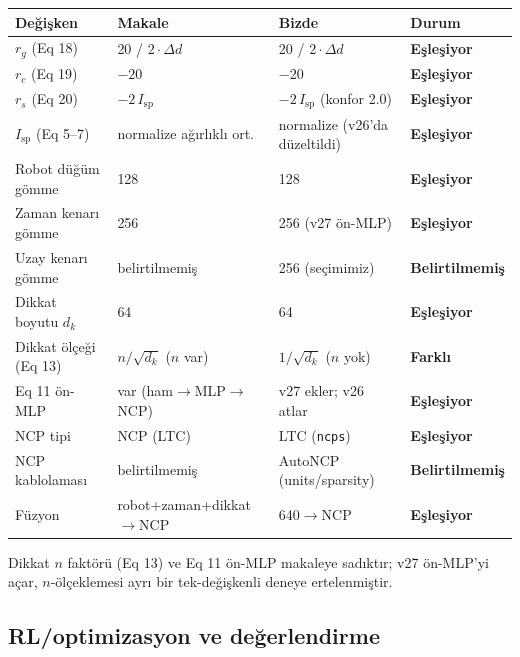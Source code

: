 \documentclass[11pt,a4paper]{article}
\newcommand{\msp}{I_{\mathrm{sp}}}
\newcommand{\dmatch}{\textcolor{cgreen}{\textbf{Eşleşiyor}}}
\newcommand{\ddiff}{\textcolor{cred}{\textbf{Farklı}}}
\newcommand{\dunspec}{\textcolor{camber}{\textbf{Belirtilmemiş}}}
\begin{document}
\begin{table}[H]
\centering\small
\begin{tabular}{@{}p{3.2cm}p{4.0cm}p{4.4cm}l@{}}
\toprule
\textbf{Değişken} & \textbf{Makale} & \textbf{Bizde} & \textbf{Durum} \\
\midrule
$r_g$ (Eq 18) & 20 / $2\cdot\Delta d$ & 20 / $2\cdot\Delta d$ & \dmatch \\
$r_c$ (Eq 19) & $-20$ & $-20$ & \dmatch \\
$r_s$ (Eq 20) & $-2\,\msp$ & $-2\,\msp$ (konfor 2.0) & \dmatch \\
$\msp$ (Eq 5--7) & normalize ağırlıklı ort. & normalize (v26'da düzeltildi) & \dmatch \\
Robot düğüm gömme & 128 & 128 & \dmatch \\
Zaman kenarı gömme & 256 & 256 (v27 ön-MLP) & \dmatch \\
Uzay kenarı gömme & belirtilmemiş & 256 (seçimimiz) & \dunspec \\
Dikkat boyutu $d_k$ & 64 & 64 & \dmatch \\
Dikkat ölçeği (Eq 13) & $n/\sqrt{d_k}$ ($n$ var) & $1/\sqrt{d_k}$ ($n$ yok) & \ddiff \\
Eq 11 ön-MLP & var (ham$\rightarrow$MLP$\rightarrow$NCP) & v27 ekler; v26 atlar & \dmatch \\
NCP tipi & NCP (LTC) & LTC (\texttt{ncps}) & \dmatch \\
NCP kablolaması & belirtilmemiş & AutoNCP (units/sparsity) & \dunspec \\
Füzyon & robot+zaman+dikkat$\rightarrow$NCP & 640$\rightarrow$NCP & \dmatch \\
\bottomrule
\end{tabular}
\par{\scriptsize Dikkat $n$ faktörü (Eq 13) ve Eq 11 ön-MLP makaleye sadıktır; v27 ön-MLP'yi açar,
$n$-ölçeklemesi ayrı bir tek-değişkenli deneye ertelenmiştir.}
\end{table}

\subsection{RL/optimizasyon ve değerlendirme}
\end{document}
